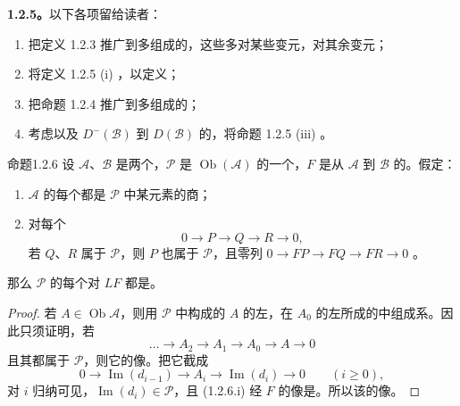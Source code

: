 \textbf{1.2.5。}以下各项留给读者：
\begin{enumerate}
\item[(i)] 把定义 1.2.3 推广到多组成的，这些多对某些变元，对其余变元；
\item[(ii)] 将定义 1.2.5 (i) ，以定义；
\item[(iii)] 把命题 1.2.4 推广到多组成的；
\item[(iv)] 考虑以及 $D^-(\mathcal B)$ 到 $D(\mathcal B)$ 的，将命题 1.2.5 (iii) 。
\end{enumerate}

\begin{SGAresult}{命题}{1.2.6}
设 $\mathcal A$、$\mathcal B$ 是两个，$\mathcal P$ 是 $\operatorname{Ob}(\mathcal A)$ 的一个，$F$ 是从 $\mathcal A$ 到 $\mathcal B$ 的。假定：
\begin{enumerate}
\item[(a)] $\mathcal A$ 的每个都是 $\mathcal P$ 中某元素的商；
\item[(b)] 对每个
\[
0\longrightarrow P\longrightarrow Q\longrightarrow R\longrightarrow0,
\]
若 $Q$、$R$ 属于 $\mathcal P$，则 $P$ 也属于 $\mathcal P$，且零列 $0\to FP\to FQ\to FR\to0$ 。
\end{enumerate}
那么 $\mathcal P$ 的每个对 $LF$ 都是。
\end{SGAresult}
\begin{proof}
若 $A\in\operatorname{Ob}\mathcal A$，则用 $\mathcal P$ 中构成的 $A$ 的左，在 $A_0$ 的左所成的中组成系。因此只须证明，若
\[
\dots\longrightarrow A_2\longrightarrow A_1\longrightarrow A_0\longrightarrow A\longrightarrow0
\]
且其都属于 $\mathcal P$，则它的像。把它截成
\[
0\longrightarrow\operatorname{Im}(d_{i-1})\longrightarrow A_i\longrightarrow\operatorname{Im}(d_i)\longrightarrow0\qquad(i\ge0),\tag{1.2.6.i}
\]
对 $i$ 归纳可见，$\operatorname{Im}(d_i)\in\mathcal P$，且 (1.2.6.i) 经 $F$ 的像是。所以该的像。
\end{proof}

